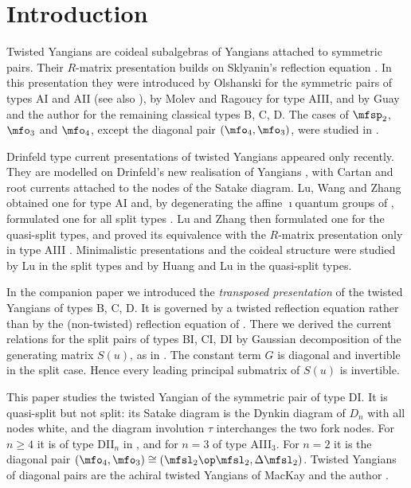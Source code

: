 \documentclass{amsart}
\numberwithin{equation}{section}
\theoremstyle{remark}
\renewcommand{\,}{\kern 0.1em} %
\begin{document}
\section{Introduction} \label{sec:intro}

Twisted Yangians are coideal subalgebras of Yangians attached to symmetric pairs. Their
$R$-matrix presentation builds on Sklyanin's reflection equation \cite{Sk88}. In this
presentation they were introduced by Olshanski \cite{Ol92} for the symmetric pairs of types AI
and AII (see also \cite{MNO96}), by Molev and Ragoucy \cite{MR02} for type AIII, and by Guay and
the author \cite{GR16} for the remaining classical types B, C, D. The cases of $\mfsp_2$, $\mfo_3$ and
$\mfo_4$, except the diagonal pair $(\mfo_4,\mfo_3)$, were studied in \cite{GRW16}.

Drinfeld type current presentations of twisted Yangians appeared only recently. They are
modelled on Drinfeld's new realisation of Yangians \cite{Dr87}, with Cartan and root currents
attached to the nodes of the Satake diagram. Lu, Wang and
Zhang obtained one for type AI \cite{LWZ25a} and, by degenerating the affine $\imath$quantum
groups of \cite{LW21, Zh22}, formulated one for all split types \cite{LWZ25b}. Lu and Zhang then
formulated one for the quasi-split types, and proved its equivalence with the $R$-matrix presentation
only in type AIII \cite{LZ25}. Minimalistic presentations and the coideal structure were studied
by Lu \cite{Lu26a} in the split types and by Huang and Lu \cite{HL26} in the quasi-split types.

In the companion paper \cite{Re26} we introduced the \emph{transposed presentation} of the
twisted Yangians of types B, C, D. It is governed by a twisted reflection equation
rather than by the (non-twisted) reflection equation of \cite{GR16}. There we derived the current relations for the split pairs of
types BI, CI, DI by Gaussian decomposition of the generating matrix $S(u)$, as in
\cite{JLM18, LWZ25a}. The constant term $G$ is diagonal and
invertible in the split case. Hence every leading principal submatrix of $S(u)$ is invertible.

This paper studies the twisted Yangian of the symmetric pair
%
\equ{
(\mfo_{2n},\, \mfo_{n-1}\op\mfo_{n+1}) , \qq n \ge 2 ,
\label{our-pair}
}
%
of type DI. It is quasi-split but not split: its Satake diagram is the Dynkin diagram of $D_n$
with all nodes white, and the diagram involution $\tau$ interchanges the two fork nodes. For
$n\ge4$ it is of type DII$_n$ in \cite{LZ25}, and for $n=3$ of type AIII$_3$. For $n=2$ it is the diagonal pair
$(\mfo_4,\mfo_3)\cong(\mfsl_2\op\mfsl_2,\Delta\mfsl_2)$. Twisted Yangians of diagonal pairs are
the achiral twisted Yangians of MacKay and the author \cite{MaRe11}.
\end{document}
